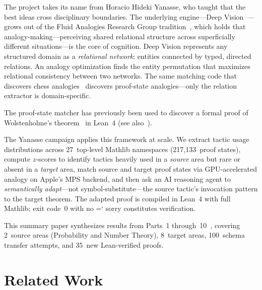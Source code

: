 \documentclass[11pt]{article}
\renewcommand{\texttt}[1]{%
  \begingroup\ttfamily\hyphenchar\font=`\-\relax
  \def\_{\textunderscore\discretionary{}{}{}}%
  #1\endgroup}
\theoremstyle{definition}
\theoremstyle{remark}
\begin{document}
The project takes its name from Horacio Hideki Yanasse, who taught
that the best ideas cross disciplinary boundaries.  The underlying
engine---Deep Vision~\cite{linhares_deep_vision,
linhares2024deepvision}---grows out of the Fluid Analogies Research
Group tradition~\cite{hofstadter_fluid_1995, hofstadter_go_1999,
hofstadter_surfaces_2013}, which holds that analogy-making---perceiving
shared relational structure across superficially different
situations---is the core of cognition.  Deep Vision represents any
structured domain as a \emph{relational network}: entities connected
by typed, directed relations.  An analogy optimization finds the
entity permutation that maximizes relational consistency between two
networks.  The same matching code that discovers chess
analogies~\cite{linhares_active_2005, linhares_understanding_2007,
linhares_questioning_2010, linhares_entanglement_2012,
linhares_what_2013, linhares_emergence_2014} discovers proof-state
analogies---only the relation extractor is domain-specific.

The proof-state matcher has previously been used to discover a formal
proof of Wolstenholme's theorem~\cite{linhares_wolstenholme_2026} in
Lean~4 (see also~\cite{linhares_sketch_2026}).

The Yanasse campaign applies this framework at scale.  We extract
tactic usage distributions across 27~top-level Mathlib namespaces
(217,133~proof states), compute $z$-scores to identify tactics heavily
used in a \emph{source} area but rare or absent in a \emph{target}
area, match source and target proof states via GPU-accelerated analogy
on Apple's MPS backend, and then ask an AI reasoning agent to
\emph{semantically adapt}---not symbol-substitute---the source
tactic's invocation pattern to the target theorem.  The adapted proof
is compiled in Lean~4 with full Mathlib; exit code~0 with no
\texttt{sorry} constitutes verification.

This summary paper synthesizes results from Parts~1
through~10~\cite{yanasse_part1, yanasse_part2, yanasse_part3,
yanasse_part4, yanasse_part5, yanasse_part6, yanasse_part7,
yanasse_part8, yanasse_part9, yanasse_part10}, covering 2~source
areas (Probability and Number Theory), 8~target areas, 100~schema
transfer attempts, and 35~new Lean-verified proofs.

\section{Related Work}\label{sec:related}
\end{document}
